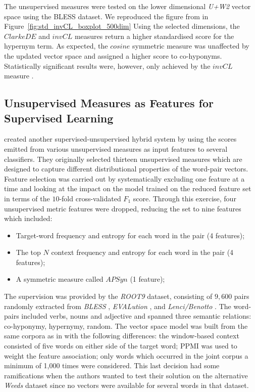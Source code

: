The unsupervised measures were tested on the lower dimensional \textit{U+W2} vector space using the BLESS dataset.  We reproduced the figure from \citep{roller2014inclusive} in Figure~\ref{fig:std_invCL_boxplot_500dim}
Using the selected dimensions, the $ClarkeDE$ and $invCL$ measures return a higher standardised score for the hypernym term.  As expected, the $cosine$ symmetric measure was unaffected by the updated vector space and assigned a higher score to co-hyponyms.  Statistically significant results were, however, only achieved by the $invCL$ measure \citep{roller2014inclusive}.

\subsection{Unsupervised Measures as Features for Supervised Learning}
\citeauthor{santus2016nine} created another supervised-unsupervised hybrid system by using the scores emitted from various unsupervised measures as input features to several classifiers.  They originally selected thirteen unsupervised measures which are designed to capture different distributional properties of the word-pair vectors.  Feature selection was carried out by systematically excluding one feature at a time and looking at the impact on the model trained on the reduced feature set in terms of the $10$-fold cross-validated $F_1$ score.  Through this exercise, four unsupervised metric features were dropped, reducing the set to nine features which included:
\begin{itemize}
    \item Target-word frequency and entropy for each word in the pair (4 features);
    \item The top $N$ context frequency and entropy for each word in the pair (4 features); 
    \item A symmetric measure called $APSyn$ \citep{santus2016unsupervised} (1 feature);
\end{itemize}
 
The supervision was provided by the \textit{ROOT9} dataset, consisting of $9,600$ pairs randomly extracted from \textit{BLESS} \citep{Baroni2011}, \textit{EVALution} \citep{santus2015evalution}, and \textit{Lenci/Benotto} \citep{benotto2015distributional}.  The word-pairs included verbs, nouns and adjective and spanned three semantic relations: co-hyponymy, hypernymy, random.  The vector space model was built from the same corpora as in \citep{santus2014chasing} with the following differences: the window-based context consisted of five words on either side of the target word; \ac{PPMI} was used to weight the feature association; only words which occurred in the joint corpus a minimum of 1,000 times were considered.  This last decision had some ramifications when the authors wanted to test their solution on the alternative \textit{Weeds} dataset \citep{weeds2014learning} since no vectors were available for several words in that dataset.

